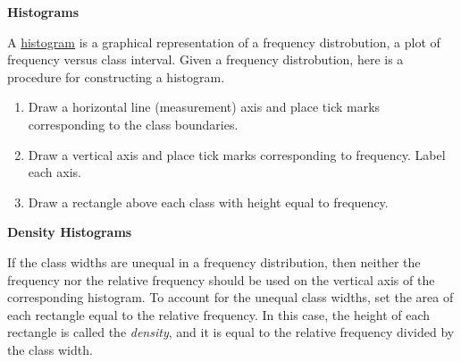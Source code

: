 \documentclass{report}
\begin{document}
\bigbreak \noindent
\begin{large}
  \textbf{Histograms} 
\end{large}
\bigbreak \noindent
A \underline{histogram} is a graphical representation of a frequency distrobution, a plot of frequency versus class interval. Given a frequency distrobution, here is a procedure for constructing a histogram.
\begin{enumerate}
  \item Draw a horizontal line (measurement) axis and place tick marks corresponding to the class boundaries.
  \item Draw a vertical axis and place tick marks corresponding to frequency. Label each axis.
  \item Draw a rectangle above each class with height equal to frequency.
\end{enumerate}

\pagebreak
{}
\bigbreak \noindent \bigbreak \noindent

\begin{LARGE}
  \noindent \textbf{Density Histograms} 
\end{LARGE}
\bigbreak \noindent
If the class widths are unequal in a frequency distribution, then neither the frequency nor the relative frequency should be used on the vertical axis of the corresponding histogram. To account for the unequal class widths, set the area of each rectangle equal to the relative frequency. In this case, the height of each rectangle is called the \textit{density}, and it is equal to the relative frequency divided by the class width.
\bigbreak \noindent
\end{document}
